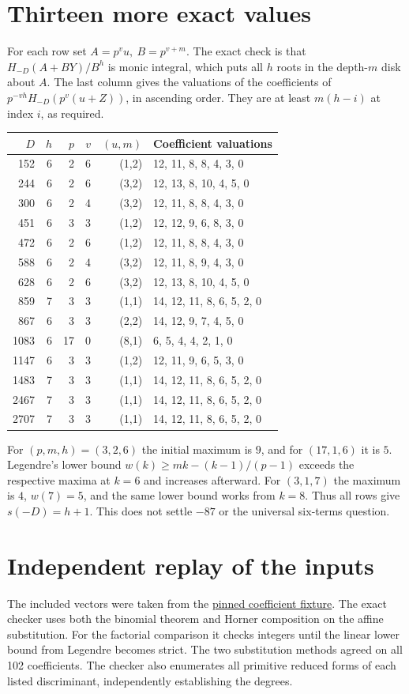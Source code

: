 \documentclass[11pt]{article}
\begin{document}
\section{Thirteen more exact values}
For each row set \(A=p^v u,\ B=p^{v+m}\). The exact check is that
\(H_{-D}(A+BY)/B^h\) is monic integral, which puts all \(h\) roots in
the depth-\(m\) disk about \(A\). The last column gives the valuations
of the coefficients of \(p^{-vh}H_{-D}(p^v(u+Z))\), in ascending order.
They are at least \(m(h-i)\) at index \(i\), as required.
\begin{center}
\small
\begin{tabular}{rrrrrl}
\toprule
\(D\) & \(h\) & \(p\) & \(v\) & \((u,m)\) & Coefficient valuations\\
\midrule
152  &6&2&6&(1,2)&12, 11, 8, 8, 4, 3, 0\\
244  &6&2&6&(3,2)&12, 13, 8, 10, 4, 5, 0\\
300  &6&2&4&(3,2)&12, 11, 8, 8, 4, 3, 0\\
451  &6&3&3&(1,2)&12, 12, 9, 6, 8, 3, 0\\
472  &6&2&6&(1,2)&12, 11, 8, 8, 4, 3, 0\\
588  &6&2&4&(3,2)&12, 11, 8, 9, 4, 3, 0\\
628  &6&2&6&(3,2)&12, 13, 8, 10, 4, 5, 0\\
859  &7&3&3&(1,1)&14, 12, 11, 8, 6, 5, 2, 0\\
867  &6&3&3&(2,2)&14, 12, 9, 7, 4, 5, 0\\
1083 &6&17&0&(8,1)&6, 5, 4, 4, 2, 1, 0\\
1147 &6&3&3&(1,2)&12, 11, 9, 6, 5, 3, 0\\
1483 &7&3&3&(1,1)&14, 12, 11, 8, 6, 5, 2, 0\\
2467 &7&3&3&(1,1)&14, 12, 11, 8, 6, 5, 2, 0\\
2707 &7&3&3&(1,1)&14, 12, 11, 8, 6, 5, 2, 0\\
\bottomrule
\end{tabular}
\end{center}
For \((p,m,h)=(3,2,6)\) the initial maximum is \(9\), and for
\((17,1,6)\) it is \(5\). Legendre's lower bound
\(w(k)\ge mk-(k-1)/(p-1)\) exceeds the respective maxima at \(k=6\)
and increases afterward. For \((3,1,7)\) the maximum is \(4\),
\(w(7)=5\), and the same lower bound works from \(k=8\). Thus all
rows give \(s(-D)=h+1\). This does not settle \(-87\) or the universal
six-terms question.
\newpage
\section{Independent replay of the inputs}
The included vectors were taken from the
\href{https://github.com/VladimirReshetnikov/ProveIt/blob/10802a6b36/Analysis/GeneralizedRiemannHypothesis/Research/grh_sparse_singular_moduli/checks/five_small_witnesses.json}{pinned coefficient fixture}.
The exact checker uses both the binomial theorem and Horner composition
on the affine substitution. For the factorial comparison it checks
integers until the linear lower bound from Legendre becomes strict.
The two substitution methods agreed on all 102 coefficients. The
checker also enumerates all primitive reduced forms of each listed
discriminant, independently establishing the degrees.
\end{document}
